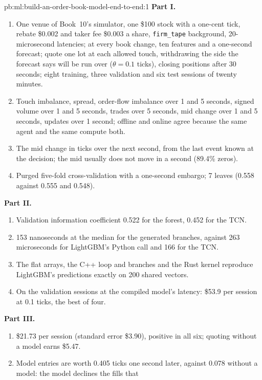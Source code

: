\begin{solution}{pb:ml:build-an-order-book-model-end-to-end:1}
\textbf{Part I.}
\begin{enumerate}
\item One venue of Book~10's simulator, one \$100 stock with a one-cent tick, rebate \$0.002 and taker fee \$0.003 a share,
\texttt{firm\_tape} background, 20-microsecond latencies; at every book change, ten features and a one-second forecast; quote one lot
at each allowed touch, withdrawing the side the forecast says will be run over ($\theta=0.1$ ticks), closing positions after 30
seconds; eight training, three validation and six test sessions of twenty minutes.
\item Touch imbalance, spread, order-flow imbalance over 1 and 5 seconds, signed volume over 1 and 5 seconds, trades over 5
seconds, mid change over 1 and 5 seconds, updates over 1 second; offline and online agree because the same agent and the same
 compute both.
\item The mid change in ticks over the next second, from the last event known at the decision; the mid usually does not move in a
second (89.4\% zeros).
\item Purged five-fold cross-validation with a one-second embargo; 7 leaves (0.558 against 0.555 and 0.548).
\end{enumerate}
\textbf{Part II.}
\begin{enumerate}[resume]
\item Validation information coefficient 0.522 for the forest, 0.452 for the TCN.
\item 153 nanoseconds at the median for the generated branches, against 263 microseconds for LightGBM's Python call and 166 for
the TCN.
\item The flat arrays, the C++ loop and branches and the Rust kernel reproduce LightGBM's predictions exactly on 200 shared vectors.
\item On the validation sessions at the compiled model's latency: \$53.9 per session at 0.1 ticks, the best of four.
\end{enumerate}
\textbf{Part III.}
\begin{enumerate}[resume]
\item \$21.73 per session (standard error \$3.90), positive in all six; quoting without a model earns \$5.47.
\item Model entries are worth 0.405 ticks one second later, against 0.078 without a model: the model declines the fills that

\end{enumerate}
\end{solution}
